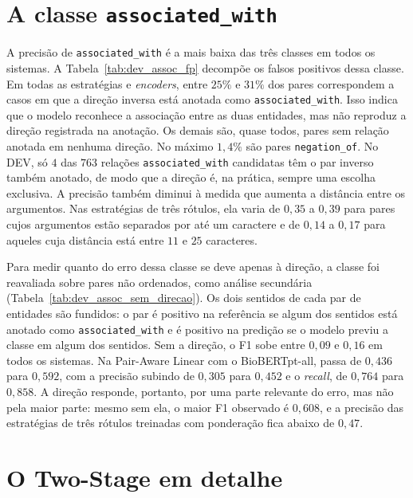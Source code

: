 \section{A classe \texttt{associated\_with}}
\label{sec:resultados_assoc}

A precisão de \texttt{associated\_with} é a mais baixa das três classes em todos os
sistemas. A Tabela~\ref{tab:dev_assoc_fp} decompõe os falsos positivos dessa classe.
Em todas as estratégias e \emph{encoders}, entre $25\%$ e $31\%$ dos pares correspondem a casos em que a direção inversa está anotada como \texttt{associated\_with}. Isso indica que o modelo reconhece a associação entre as duas entidades, mas não reproduz a direção registrada na anotação. Os demais são, quase
todos, pares sem relação anotada em nenhuma direção. No máximo $1{,}4\%$ são pares
\texttt{negation\_of}. No DEV, só $4$ das $763$ relações \texttt{associated\_with}
candidatas têm o par inverso também anotado, de modo que a direção é, na prática,
sempre uma escolha exclusiva. A precisão também diminui à medida que aumenta a distância entre os argumentos. Nas estratégias de três rótulos, ela varia de $0{,}35$ a $0{,}39$ para pares cujos argumentos estão separados por até um caractere e de $0{,}14$ a $0{,}17$ para aqueles cuja distância está entre $11$ e $25$ caracteres.



Para medir quanto do erro dessa classe se deve apenas à direção, a classe foi
reavaliada sobre pares não ordenados, como análise secundária
(Tabela~\ref{tab:dev_assoc_sem_direcao}). Os dois sentidos de cada par de entidades
são fundidos: o par é positivo na referência se algum dos sentidos está anotado como
\texttt{associated\_with} e é positivo na predição se o modelo previu a classe em
algum dos sentidos. Sem a direção, o F1 sobe entre $0{,}09$ e $0{,}16$ em todos os
sistemas. Na Pair-Aware Linear com o BioBERTpt-all, passa de $0{,}436$ para
$0{,}592$, com a precisão subindo de $0{,}305$ para $0{,}452$ e o \emph{recall}, de
$0{,}764$ para $0{,}858$. A direção responde, portanto, por uma parte relevante do
erro, mas não pela maior parte: mesmo sem ela, o maior F1 observado é $0{,}608$, e a
precisão das estratégias de três rótulos treinadas com ponderação fica abaixo de
$0{,}47$.



\section{O Two-Stage em detalhe}
\label{sec:resultados_twostage}

